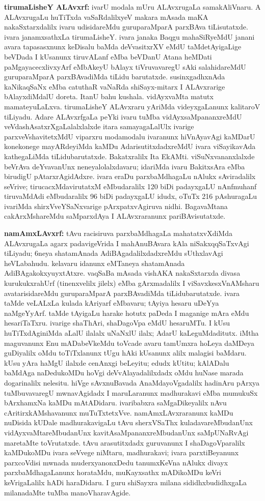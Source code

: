 {\textbf{tirumaLisheY ALAvxrf:}} ivarU modala mUru ALAvxrugaLa samakAliVnaru. A ALAvxrugaLu huTiTxda vaSaRdalilxyeV makara mAsada maKA nakaSxtarxdalilx ivaru udisidareMdu guruparaMparA parxBAva tiLisutatxde. ivara janamxsathxLa tirumaLisheY. ivara janaka Baqgu mahaSiRyeMdU janani avara tapasasxnunx keDisalu baMda deVvasitxrXV eMdU taMdetAyigaLige beVDada I kUsanunx tiruvALanf eMba beVDanU Atana heMDati paMgayacecxlivxyArf eMbAkeyU bAlayx tiVruvavaregU sAki salahidareMdU guruparaMparA parxBAvadiMda tiLidu barutatxde. susinxgadhxnAda kaNikaqSaNx eMba catuthaR vaNaRda shiSayx-mitarx I ALAvxrarige bAlayxdiMdalU doreta. ItanU bahu kushala. vidAyxvaMta matutx mamateyuLaLxva. tirumaLisheY ALAvxraru yAriMda videyxgaLanunx kalitaroV tiLiyadu. Adare ALAvxrfgaLa peYki ivaru tuMba vidAyxsaMpananxreMdU veVdashAsatxrXgaLalalxlalxde itara samayagaLalUlx ivarige parxveVshavitetxMdU viparxru modamodalu ivaranunx hiVnAyavAgi kaMDarU konekonege mayARdeyiMda kaMDu AdarisutitxdadxreMdU ivara viSayikavAda kathegaLiMda tiLidubarutatxde. Bakatxralilx Ita EkAMti. viSuNxvananxlalxde beVrAva deYvavanUnx neneyalolalxdavaru; idariMda ivaru BakitxsAra eMba birudigU pAtarxrAgidAdxre. ivara eraDu parxbaMdhagaLu nAlukx sAviradalilx seVrive; tirucacxMdavirutatxM eMbudaralilx {\rm 120} biDi padayxgaLU nAnfmuhanf tiruvaMdAdi eMbudaralilx {\rm 96} biDi padayxgaLU idudx, oTuTx {\rm 216} pAshuragaLu ivariMda shirxVveYSaNxvarige pArxpatxvAgiruva nidhi. BagavaMtana cakArxMshareMdu saMparxdAya I ALAvxraranunx pariBAvisutatxde.

{\textbf{namAmxLAvxrf:}} tAvu racisiruva parxbaMdhagaLa mahatatxvXdiMda ALAvxrugaLa agarx padavigeVrida I mahAnuBAvara kAla niSakxqqSaTxvAgi tiLiyadu; {\rm 6}neya shatamAnada AdiBAgadalilxdadxreMdu sUthxlavAgi heVLabahudu. kelavaru idanunx eMTaneya shatamAnada AdiBAgakokxyuyxtAtxre. vaqSaBa mAsada vishAKA nakaSxtarxda divasa kurukukxrahUrf (tinenxvelilx jilelx) eMba gArxmadalilx I viSavxkesxVnAMsharu avatarisidareMdu guruparaMparA parxBAvadiMda tiLidubarutatxde. ivara taMde veLALxLa kulada kAriyarf eMbavaru; tAyiya hesaru uDeYya naMgeYyArf. taMde tAyigaLu harake hotutx paDeda I maganige mAra eMdu hesariTaTxru. ivarige shaThAri, shaDagoVpa eMdU hesaruMTu. I kUsu huTiTxdAginiMda aLalU ilalalx uNaNxlU ilalx; AdarU kaLeguMdaditutx. iMtha maguvanunx Enu mADabeVkeMdu toVcade avaru tamUmxra hoLeya daMDeya guDiyalilx oMdu toTiTxlanunx tUgu hAki kUsanunx alilx malagisi baMdaru. kUsu yAra haMgU ilalxde cenAnxgi beLeyitu; edudx kUtitu; kAlADalu baMdAga naDedukoMDu hoVgi deVvAlayadalilxdadx oMdu huNase marada dogarinalilx nelesitu. hiVge sAvxnuBavada AnaMdayoVgadalilx hadinAru pArxya tuMbuvavaregU mwnavAgidadx I maruLaranunx madhurakavi eMba mumukuSx bArxhamxNa kaMDu mAtADidaru. ivaribabxra saMgaDikeyalilx nAvu cAritirxkAMshavanunx muTuTxtetxVve. namAmxLAvxraranunx kaMDu nuDisida kUDale madhurakavigaLu tAvu sherxVSaThx kuladavareMbudanUnx vidAyxvaMtareMbudanUnx kavitAsaMpananxreMbudanUnx saMpUNaRvAgi maretaMte toVrutatxde. tAvu arasutitxdadx guruvanunx I shaDagoVparalilx kaMDukoMDu ivara seVvege niMtaru, madhurakavi; ivara parxtiBeyanunx parxcoVdisi mwnada muderxyanonxDedu tanumxKeVna nAlukx divayx parxbaMdhagaLanunx horataMdu, muKayxsathx mADikoMDu keVri keVrigaLalilx hADi haraDidaru. I guru shiSayxra milana sididhxbudidhxgaLa milanadaMte tuMba manoVharavAgide.

